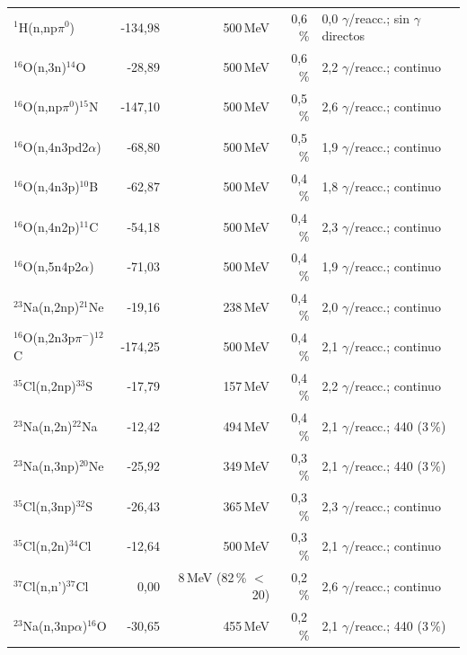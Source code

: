 \documentclass[11pt,a4paper]{article}
\begin{document}
{\begin{longtable}{p{4.4cm}rrrp{4.6cm}}
$^{1}$H(n,np$\pi^0$) & -134,98 & 500\,MeV & 0,6\,\% & 0,0 $\gamma$/reacc.; sin $\gamma$ directos \\
$^{16}$O(n,3n)$^{14}$O & -28,89 & 500\,MeV & 0,6\,\% & 2,2 $\gamma$/reacc.; continuo \\
$^{16}$O(n,np$\pi^0$)$^{15}$N & -147,10 & 500\,MeV & 0,5\,\% & 2,6 $\gamma$/reacc.; continuo \\
$^{16}$O(n,4n3pd2$\alpha$) & -68,80 & 500\,MeV & 0,5\,\% & 1,9 $\gamma$/reacc.; continuo \\
$^{16}$O(n,4n3p)$^{10}$B & -62,87 & 500\,MeV & 0,4\,\% & 1,8 $\gamma$/reacc.; continuo \\
$^{16}$O(n,4n2p)$^{11}$C & -54,18 & 500\,MeV & 0,4\,\% & 2,3 $\gamma$/reacc.; continuo \\
$^{16}$O(n,5n4p2$\alpha$) & -71,03 & 500\,MeV & 0,4\,\% & 1,9 $\gamma$/reacc.; continuo \\
$^{23}$Na(n,2np)$^{21}$Ne & -19,16 & 238\,MeV & 0,4\,\% & 2,0 $\gamma$/reacc.; continuo \\
$^{16}$O(n,2n3p$\pi^-$)$^{12}$C & -174,25 & 500\,MeV & 0,4\,\% & 2,1 $\gamma$/reacc.; continuo \\
$^{35}$Cl(n,2np)$^{33}$S & -17,79 & 157\,MeV & 0,4\,\% & 2,2 $\gamma$/reacc.; continuo \\
$^{23}$Na(n,2n)$^{22}$Na & -12,42 & 494\,MeV & 0,4\,\% & 2,1 $\gamma$/reacc.; 440 (3\,\%) \\
$^{23}$Na(n,3np)$^{20}$Ne & -25,92 & 349\,MeV & 0,3\,\% & 2,1 $\gamma$/reacc.; 440 (3\,\%) \\
$^{35}$Cl(n,3np)$^{32}$S & -26,43 & 365\,MeV & 0,3\,\% & 2,3 $\gamma$/reacc.; continuo \\
$^{35}$Cl(n,2n)$^{34}$Cl & -12,64 & 500\,MeV & 0,3\,\% & 2,1 $\gamma$/reacc.; continuo \\
$^{37}$Cl(n,n')$^{37}$Cl & 0,00 & 8\,MeV (82\,\% $<$\,20) & 0,2\,\% & 2,6 $\gamma$/reacc.; continuo \\
$^{23}$Na(n,3np$\alpha$)$^{16}$O & -30,65 & 455\,MeV & 0,2\,\% & 2,1 $\gamma$/reacc.; 440 (3\,\%) \\
\bottomrule\end{longtable}}
\end{document}
